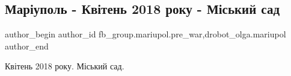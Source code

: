  
 
 
 
 

\subsection{Маріуполь - Квітень 2018 року - Міський сад}
\label{sec:22_01_2023.fb.fb_group.mariupol.pre_war.2.mar_upol___kv_ten_20}
 
\ifcmt
 author_begin
   author_id fb_group.mariupol.pre_war,drobot_olga.mariupol
 author_end
\fi

Квітень 2018 року. Міський сад.

